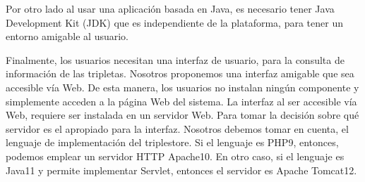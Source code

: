 Por otro lado al usar una aplicación basada en Java, es necesario tener Java Development Kit (JDK) que es independiente de la plataforma, para tener un entorno amigable al usuario.

Finalmente, los usuarios necesitan una interfaz de usuario, para la consulta de información de las tripletas. Nosotros proponemos una interfaz amigable que sea accesible vía Web. De esta manera, los usuarios no instalan ningún componente y simplemente acceden a la página Web del sistema.
La interfaz al ser accesible vía Web, requiere ser instalada en un servidor Web. Para tomar la decisión sobre qué servidor es el apropiado para la interfaz. Nosotros debemos tomar en cuenta, el lenguaje de implementación del triplestore. Si el lenguaje es PHP9, entonces, podemos emplear un servidor HTTP Apache10. En otro caso, si el lenguaje es Java11 y permite implementar Servlet, entonces el servidor es Apache Tomcat12. 
